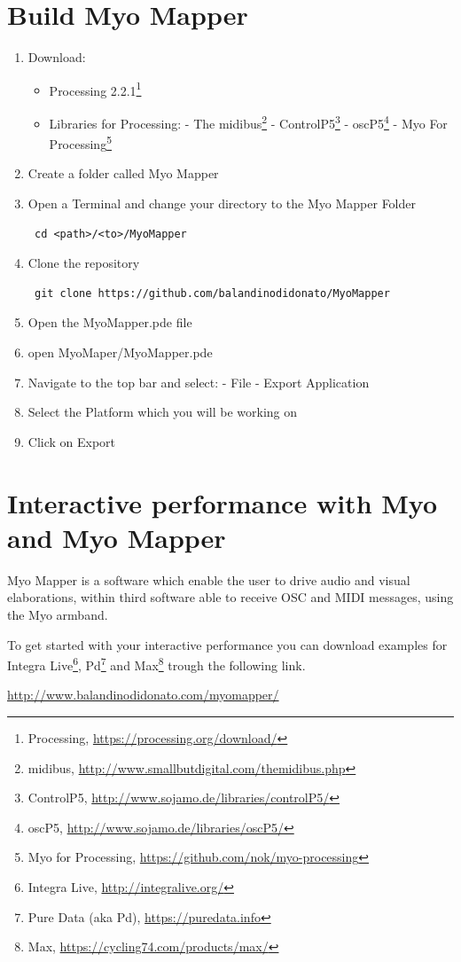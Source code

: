 \documentclass[12pt,a4paper]{article}
\begin{document}
\section{Build Myo Mapper}
\begin{enumerate}
	\item Download:
	\begin{itemize}
		\item Processing 2.2.1\footnote{Processing, \url{https://processing.org/download/}}
		\item Libraries for Processing:
		\subitem - The midibus\footnote{midibus, \url{http://www.smallbutdigital.com/themidibus.php}}
		\subitem - ControlP5\footnote{ControlP5, \url{http://www.sojamo.de/libraries/controlP5/}}
		\subitem - oscP5\footnote{oscP5, \url{http://www.sojamo.de/libraries/oscP5/}}
		\subitem - Myo For Processing\footnote{Myo for Processing, \url{https://github.com/nok/myo-processing}}
	\end{itemize}
	\item Create a folder called Myo Mapper
	\item Open a Terminal and change your directory to the Myo Mapper Folder
	\begin{verbatim} cd <path>/<to>/MyoMapper \end{verbatim}
	\item Clone the repository
	\begin{verbatim} git clone https://github.com/balandinodidonato/MyoMapper \end{verbatim}
	\item Open the MyoMapper.pde file
	\item open MyoMaper/MyoMapper.pde
	\item Navigate to the top bar and select:
	\subitem - File
	\subitem - Export Application 
	\item Select the Platform which you will be working on
	\item Click on Export
\end{enumerate}

\newpage
\section{Interactive performance with Myo and Myo Mapper}

Myo Mapper is a software which enable the user to drive audio and visual elaborations, within third software able to receive OSC  and MIDI messages, using the Myo armband.

To get started with your interactive performance you can download examples for Integra Live\footnote{Integra Live, \url{http://integralive.org/}}, Pd\footnote{Pure Data (aka Pd), \url{https://puredata.info}} and Max\footnote{Max, \url{https://cycling74.com/products/max/}} trough the following link.

\url{http://www.balandinodidonato.com/myomapper/}
\end{document}
